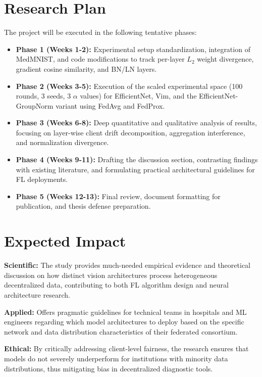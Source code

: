 \documentclass[conference]{IEEEtran}
\begin{document}
\section{Research Plan}
The project will be executed in the following tentative phases:
\begin{itemize}
    \item \textbf{Phase 1 (Weeks 1-2):} Experimental setup standardization, integration of MedMNIST, and code modifications to track per-layer $L_2$ weight divergence, gradient cosine similarity, and BN/LN layers.
    \item \textbf{Phase 2 (Weeks 3-5):} Execution of the scaled experimental space (100 rounds, 3 seeds, 3 $\alpha$ values) for EfficientNet, Vim, and the EfficientNet-GroupNorm variant using FedAvg and FedProx.
    \item \textbf{Phase 3 (Weeks 6-8):} Deep quantitative and qualitative analysis of results, focusing on layer-wise client drift decomposition, aggregation interference, and normalization divergence.
    \item \textbf{Phase 4 (Weeks 9-11):} Drafting the discussion section, contrasting findings with existing literature, and formulating practical architectural guidelines for FL deployments.
    \item \textbf{Phase 5 (Weeks 12-13):} Final review, document formatting for publication, and thesis defense preparation.
\end{itemize}

\section{Expected Impact}
\textbf{Scientific:} The study provides much-needed empirical evidence and theoretical discussion on how distinct vision architectures process heterogeneous decentralized data, contributing to both FL algorithm design and neural architecture research.

\textbf{Applied:} Offers pragmatic guidelines for technical teams in hospitals and ML engineers regarding which model architectures to deploy based on the specific network and data distribution characteristics of their federated consortium.

\textbf{Ethical:} By critically addressing client-level fairness, the research ensures that models do not severely underperform for institutions with minority data distributions, thus mitigating bias in decentralized diagnostic tools.
\end{document}
